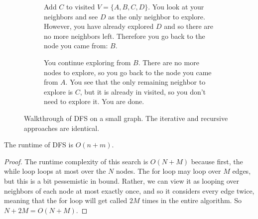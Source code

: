 \begin{example}
\begin{figure}[H]
\begin{subfigure}[b]{0.48\textwidth}
        \caption{Add $C$ to visited $V = \{A, B, C, D\}$. You look at your neighbors and see $D$ as the only neighbor to explore. However, you have already explored $D$ and so there are no more neighbors left. Therefore you go back to the node you came from: $B$.}
      \end{subfigure}
      \hfill 
      \begin{subfigure}[b]{0.48\textwidth}
        \centering
        \caption{You continue exploring from $B$. There are no more nodes to explore, so you go back to the node you came from $A$. You see that the only remaining neighbor to explore is $C$, but it is already in visited, so you don't need to explore it. You are done.}
      \end{subfigure}

      \caption{Walkthrough of DFS on a small graph. The iterative and recursive approaches are identical.}
      \label{fig:dfs_example}
    \end{figure}
  \end{example}

  \begin{theorem}
    The runtime of DFS is $O(n+m)$. 
  \end{theorem}
  \begin{proof}
    The runtime complexity of this search is $O(N + M)$ because first, the while loop loops at most over the $N$ nodes. The for loop may loop over $M$ edges, but this is a bit pessemistic in bound. Rather, we can view it as looping over neighbors of each node at most exactly once, and so it considers every edge twice, meaning that the for loop will get called $2M$ times in the entire algorithm. So $N + 2M = O(N + M)$. 
  \end{proof}

